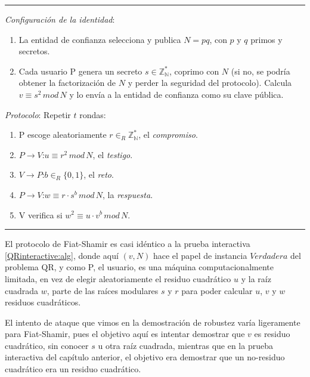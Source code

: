 \rule{\textwidth}{1pt}
\begin{algorithm}
	\hfil
	
	\textit{Configuración de la identidad}:
	\begin{enumerate}
		\item La entidad de confianza selecciona y publica $N=pq$, con $p$ y $q$ primos y secretos.
		
		\item Cada usuario P genera un secreto $s \in \mathbb{Z_N^*}$, coprimo con $N$ (si no, se podría obtener la factorización de $N$ y perder la seguridad del protocolo). Calcula $v \equiv s^2 \, mod \, N$ y lo envía a la entidad de confianza como su clave pública.
		
	\end{enumerate}
	
	
	\textit{Protocolo}: Repetir $t$ rondas:
	\begin{enumerate}
		\item P escoge aleatoriamente $r \in_R \mathbb{Z_N^*}$, el \textit{compromiso}.
		\item $P \rightarrow V$:\quad $u \equiv r^2 \, mod \, N$, el \textit{testigo}.
		\item $V \rightarrow P$:\quad $b \in_R \{0,1\}$, el \textit{reto}.
		\item $P \rightarrow V$:\quad $w \equiv r\cdot s^b \, mod \, N$, la \textit{respuesta}.
		\item V verifica si \quad $ w^2 \equiv u\cdot v^b \, mod \, N$.
	\end{enumerate}
	
\end{algorithm}
\rule{\textwidth}{1pt}

\hfil


El protocolo de Fiat-Shamir es casi idéntico a la prueba interactiva \ref{QRinteractive:alg}, donde aquí $(v,N)$ hace el papel de instancia $Verdadera$ del problema QR, y como P, el usuario, es una máquina computacionalmente limitada, en vez de elegir aleatoriamente el residuo cuadrático $u$ y la raíz cuadrada $w$, parte de las raíces modulares $s$ y $r$ para poder calcular $u$, $v$ y $w$ residuos cuadráticos.


El intento de ataque que vimos en la demostración de robustez varía ligeramente para Fiat-Shamir, pues el objetivo aquí es intentar demostrar que $v$ es residuo cuadrático, sin conocer $s$ u otra raíz cuadrada, mientras que en la prueba interactiva del capítulo anterior, el objetivo era demostrar que un no-residuo cuadrático era un residuo cuadrático.

